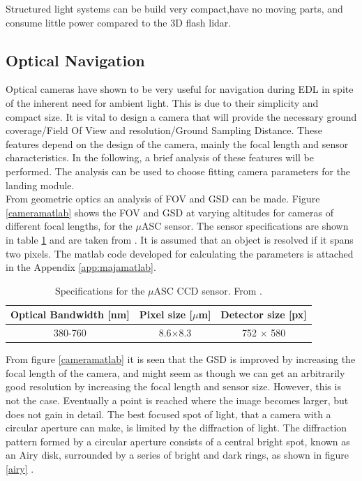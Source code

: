 Structured light systems can be build very compact,have no moving parts, and consume little power compared to the 3D flash lidar. 

\subsection{Optical Navigation}

Optical cameras have shown to be very useful for navigation during EDL in spite of the inherent need for ambient light. This is due to their simplicity and compact size. It is vital to design a camera that will provide the necessary ground coverage/Field Of View and resolution/Ground Sampling Distance. These features depend on the design of the camera, mainly the focal length and sensor characteristics. In the following, a brief analysis of these features will be performed. The analysis can be used to choose fitting camera parameters for the landing module. \\

From geometric optics an analysis of FOV and GSD can be made. Figure \ref{cameramatlab} shows the FOV  and GSD at varying altitudes for cameras of different focal lengths, for the $\mu$ASC sensor. The sensor specifications are shown in table \ref{tab:ASC} and are taken from \cite{alessandro}. It is assumed that an object is resolved if it spans two pixels. The matlab code developed for calculating the parameters is attached in the Appendix \ref{app:majamatlab}.

\begin{table}[htb]
\begin{center}
\begin{tabular}{|c|c|c|}
\hline
Optical Bandwidth [nm] & Pixel size [$\mu$m] & Detector size [px]\\
\hline
380-760  & 8.6$\times $8.3 & 752 $\times$ 580 \\
\hline
\end{tabular}

\caption{Specifications for the $\mu$ASC CCD sensor. From \cite{alessandro}.}

\label{tab:ASC}
\end{center}
\end{table}

From figure \ref{cameramatlab} it is seen that the GSD is improved by increasing the focal length of the camera, and might seem as though we can get an arbitrarily good resolution by increasing the focal length and sensor size. However, this is not the case. Eventually a point is reached where the image becomes larger, but does not gain in detail. The best focused spot of light, that a camera with a circular aperture can make, is limited by the diffraction of light. The diffraction pattern formed by a circular aperture consists of a central bright spot, known as an Airy disk, surrounded by a series of bright and dark rings, as shown in figure \ref{airy} \cite{uniphys}.

